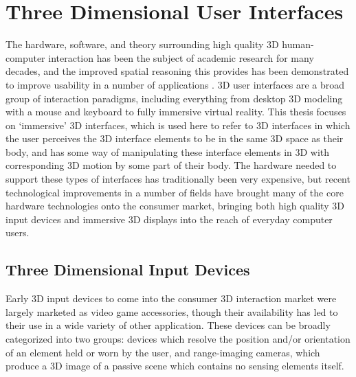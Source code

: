 \section{Three Dimensional User Interfaces}

The hardware, software, and theory surrounding high quality 3D human-computer interaction has been the subject of academic research for many decades, and the improved spatial reasoning this provides has been demonstrated to improve usability in a  number of applications  \cite{bowman_theory_practice}. 3D user interfaces are a broad group of interaction paradigms, including everything from desktop 3D modeling with a mouse and keyboard to fully immersive virtual reality.  This thesis focuses on ‘immersive’ 3D interfaces, which is used here to refer to 3D interfaces in which the user perceives the 3D interface elements to be in the same 3D space as their body, and has some way of manipulating these interface elements in 3D with corresponding 3D motion by some part of their body.  The hardware needed to support these types of interfaces has traditionally been very expensive, but recent technological improvements in a number of fields have brought many of the core hardware technologies onto the consumer market, bringing both high quality 3D input devices and immersive 3D displays into the reach of everyday computer users.

\subsection{Three Dimensional Input Devices}

Early 3D input devices to come into the consumer 3D interaction market were largely marketed as video game accessories, though their availability has led to their use in a wide variety of other application. These devices can be broadly categorized into two groups: devices which resolve the position and/or orientation of an element held or worn by the user, and range-imaging cameras, which produce a 3D image of a passive scene which contains no sensing elements itself.

